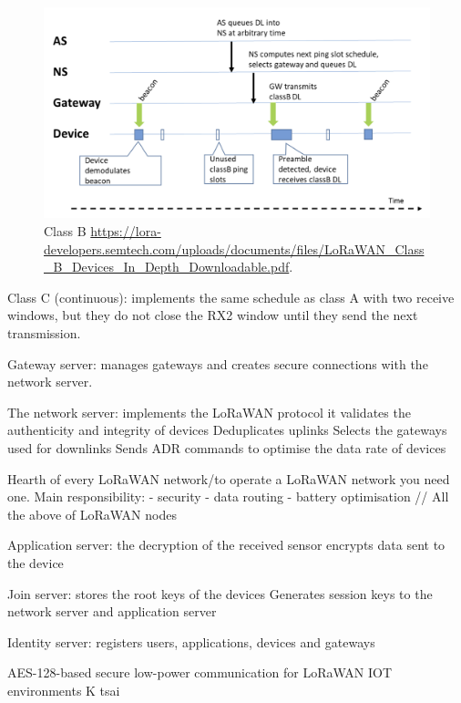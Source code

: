 \begin{figure}[H]
    \centering
    \includegraphics[width=0.7\linewidth]{figures/class_B.png}
    \caption{Class B \url{https://lora-developers.semtech.com/uploads/documents/files/LoRaWAN_Class_B_Devices_In_Depth_Downloadable.pdf}.}
    \label{fig:Class_B}
\end{figure}

Class C (continuous): implements the same schedule as class A with two receive windows, but they do not close the RX2 window until they send the next transmission.


Gateway server:
manages gateways and creates secure connections with the network server.

The network server: 
implements the \ac{LoRaWAN} protocol
it validates the authenticity and integrity of devices
Deduplicates uplinks
Selects the gateways used for downlinks
Sends ADR commands to optimise the data rate of devices

Hearth of every \ac{LoRaWAN} network/to operate a \ac{LoRaWAN} network you need one.
Main responsibility:
- security
- data routing
- battery optimisation
// All the above of \ac{LoRaWAN} nodes

Application server:
the decryption of the received sensor
encrypts data sent to the device

Join server:
stores the root keys of the devices
Generates session keys to the network server and application server

Identity server:
registers users, applications, devices and gateways

AES-128-based secure low-power communication for \ac{LoRaWAN} \ac{IOT} environments K tsai

